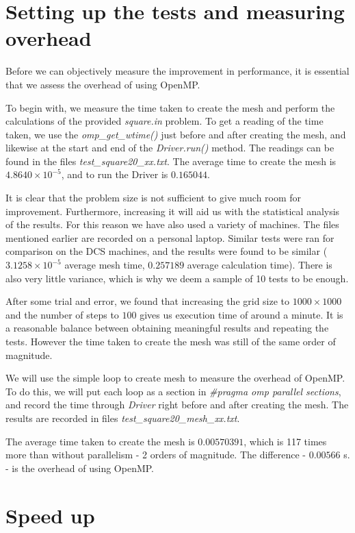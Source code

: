 \documentclass[11pt,journal]{IEEEtran}
\begin{document}
	\section{Setting up the tests and measuring overhead}
	Before we can objectively measure the improvement in performance, it is essential that we assess the overhead of using OpenMP. 
	
	To begin with, we measure the time taken to create the mesh and perform the calculations of the provided \emph{square.in} problem. To get a reading of the time taken, we use the \emph{omp\_get\_wtime()} just before and after creating the mesh, and likewise at the start and end of the \emph{Driver.run()} method. The readings can be found in the files \emph{test\_square20\_xx.txt}. The average time to create the mesh is $4.8640 \times 10^{-5}$, and to run the Driver is $0.165044$.
	
	It is clear that the problem size is not sufficient to give much room for improvement. Furthermore, increasing it will aid us with the statistical analysis of the results. For this reason we have also used a variety of machines. The files mentioned earlier are recorded on a personal laptop. Similar tests were ran for comparison on the DCS machines, and the results were found to be similar ($3.1258 \times 10^{-5}$ average mesh time, $0.257189$ average calculation time). There is also very little variance, which is why we deem a sample of 10 tests to be enough.
	
	After some trial and error, we found that increasing the grid size to $1000 \times 1000$ and the number of steps to $100$ gives us execution time of around a minute. It is a reasonable balance between obtaining meaningful results and repeating the tests. However the time taken to create the mesh was still of the same order of magnitude.
	
	We will use the simple loop to create mesh to measure the overhead of OpenMP. To do this, we will put each loop as a section in \emph{\#pragma omp parallel sections}, and record the time through \emph{Driver} right before and after creating the mesh. The results are recorded in files \emph{test\_square20\_mesh\_xx.txt}.
	
	The average time taken to create the mesh is $0.00570391$, which is 117 times more than without parallelism - 2 orders of magnitude. The difference - $0.00566$ s. - is the overhead of using OpenMP.
	
	
	\section{Speed up}
	
\end{document}
